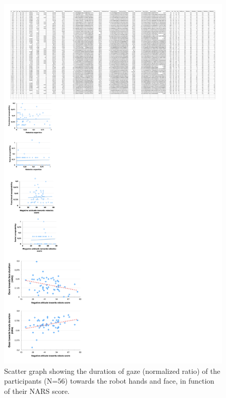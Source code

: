 \documentclass[twocolumn]{svjour3}          %
\begin{document}
\begin{figure}
\centering
\includegraphics[width=0.99\hsize]{figures/plots_nars_gaze_3.pdf}
\caption{Scatter graph showing the duration of gaze (normalized ratio) of the participants (N=56) towards the robot hands and face, in function of their NARS score. }
\label{fig:narsgaze}
\end{figure}
\end{document}
